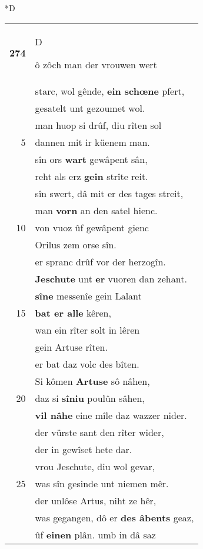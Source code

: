 \documentclass[8pt,a4paper,notitlepage]{article}
\begin{document}
\begin{table}[ht]
\begin{minipage}[t]{0.5\linewidth}
\small
\begin{center}*D
\end{center}
\begin{tabular}{rl}
\textbf{274} & \begin{large}D\end{large}ô zôch man der vrouwen wert\\ 
 & starc, wol gênde, \textbf{ein schœne} pfert,\\ 
 & gesatelt unt gezoumet wol.\\ 
 & man huop si drûf, diu rîten sol\\ 
5 & dannen mit ir küenem man.\\ 
 & sîn ors \textbf{wart} gewâpent sân,\\ 
 & reht als erz \textbf{gein} strîte reit.\\ 
 & sîn swert, dâ mit er des tages streit,\\ 
 & man \textbf{vorn} an den satel hienc.\\ 
10 & von vuoz ûf gewâpent gienc\\ 
 & Orilus zem orse sîn.\\ 
 & er spranc drûf vor der herzogîn.\\ 
 & \textbf{Jeschute} unt \textbf{er} vuoren dan zehant.\\ 
 & \textbf{sîne} messenîe gein Lalant\\ 
15 & \textbf{bat er alle} kêren,\\ 
 & wan ein rîter solt in lêren\\ 
 & gein Artuse rîten.\\ 
 & er bat daz volc des bîten.\\ 
 & Si kômen \textbf{Artuse} sô nâhen,\\ 
20 & daz si \textbf{sîniu} poulûn sâhen,\\ 
 & \textbf{vil nâhe} eine mîle daz wazzer nider.\\ 
 & der vürste sant den rîter wider,\\ 
 & der in gewîset hete dar.\\ 
 & vrou Jeschute, diu wol gevar,\\ 
25 & was sîn gesinde unt niemen mêr.\\ 
 & der unlôse Artus, niht ze hêr,\\ 
 & was gegangen, dô er \textbf{des âbents} geaz,\\ 
 & ûf \textbf{einen} plân. umb in dâ saz\\ 

\end{tabular}
\end{minipage}
\end{table}
\end{document}
